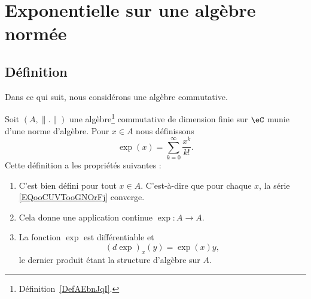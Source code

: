 
\section{Exponentielle sur une algèbre normée}

\subsection{Définition}

Dans ce qui suit, nous considérons une algèbre commutative.
\begin{propositionDef}       \label{DEFooSFDUooMNsgZY}
    Soit \( (A,\| . \|)\) une algèbre\footnote{Définition~\ref{DefAEbnJqI}.} commutative de dimension finie sur \( \eC\) munie d'une norme d'algèbre. Pour \( x\in A\) nous définissons
    \begin{equation}        \label{EQooCUVTooGNOrFj}
        \exp(x)=\sum_{k=0}^{\infty}\frac{ x^k }{ k! }.
    \end{equation}
    Cette définition a les propriétés suivantes :
    \begin{enumerate}
        \item
            C'est bien défini pour tout \( x\in A\). C'est-à-dire que pour chaque \( x\), la série \eqref{EQooCUVTooGNOrFj} converge.
        \item
            Cela donne une application continue \( \exp\colon A\to A\).
        \item       \label{ITEMooGGVAooVfhGuu}
            La fonction \( \exp\) est différentiable et
            \begin{equation}        \label{EQooKWBUooLUdBAw}
                (d\exp)_x(y)=\exp(x)y,
            \end{equation}
            le dernier produit étant la structure d'algèbre sur \( A\).
    \end{enumerate}
\end{propositionDef}

